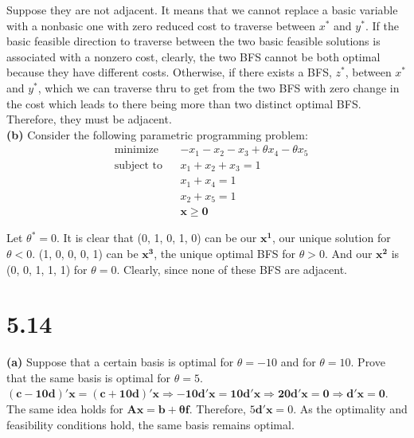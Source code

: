\documentclass{article}
\begin{document}
\noindent
Suppose they are not adjacent.  It means that we cannot replace a basic variable with a nonbasic one with zero reduced cost to traverse between $x^*$ and $y^*$.  If the basic feasible direction to traverse between the two basic feasible solutions is associated with a nonzero cost, clearly, the two BFS cannot be both optimal because they have different costs.  Otherwise,  if there exists a BFS, $z^*$, between $x^*$ and $y^*$, which we can traverse thru to get from the two BFS with zero change in the cost which leads to there being more than two distinct optimal BFS.  Therefore, they must be adjacent. \\

\noindent
\textbf{(b)}
Consider the following parametric programming problem: \\
\begin{equation*}
\begin{aligned}
& \text{minimize} && -x_1 - x_2 - x_3 + \theta x_4 - \theta x_5 \\
& \text{subject to} &&  x_1 + x_2 + x_3 = 1\\
& & & x_1 + x_4 = 1 \\
& & & x_2 + x_5 = 1 \\
& & &\mathbf{x \geq 0}
\end{aligned}
\end{equation*}

\noindent
Let $\theta^* = 0$.  It is clear that (0, 1, 0, 1, 0) can be our $\mathbf{x^1}$, our unique solution for $\theta < 0$.   (1, 0, 0, 0, 1) can be $\mathbf{x^3}$, the unique optimal BFS for $\theta > 0$.   And our $\mathbf{x^2}$ is (0, 0, 1, 1, 1) for $\theta = 0$.  Clearly, since none of these BFS are adjacent. \\

\section*{5.14}
\textbf{(a)} Suppose that a certain basis is optimal for $\theta = -10$ and for $\theta = 10$.  Prove that the same basis is optimal for $\theta = 5$.  \\

\noindent
$\mathbf{(c - 10d)' x = (c + 10d)' x \Rightarrow -10d'x = 10d'x \Rightarrow 20d'x = 0 \Rightarrow d'x = 0}$.  The same idea holds for $\mathbf{Ax = b + \theta f}$.  Therefore, $5 \mathbf{d'x} = 0$.  As the optimality and feasibility conditions hold, the same basis remains optimal. \\
\end{document}
